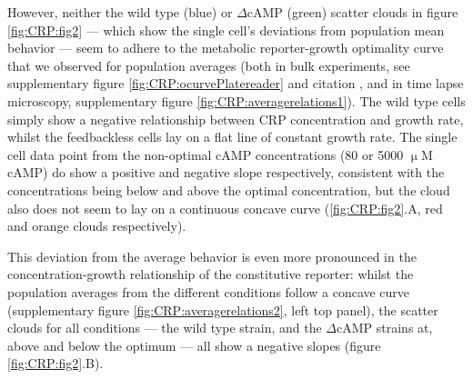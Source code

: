However, neither the wild type (blue) or $\Delta$cAMP (green) scatter clouds in figure \ref{fig:CRP:fig2}
--- which show the single cell's deviations from population mean behavior --- 
seem to adhere to the metabolic reporter-growth optimality curve that we observed for population averages 
(both in bulk experiments, see supplementary figure \ref{fig:CRP:ocurvePlatereader} and citation \cite{Towbin2017}, and in time lapse microscopy, supplementary figure \ref{fig:CRP:averagerelations1}).
%
The wild type cells simply show a negative relationship between CRP concentration and growth rate, whilst the feedbackless cells 
lay on a flat line of constant growth rate. 
%
The single cell data point from the non-optimal cAMP concentrations (80 or 5000 $\upmu$M cAMP) do show a positive and negative slope respectively, 
consistent with the concentrations being below and above the optimal concentration,
but the cloud also does not seem to lay on a continuous concave curve (\ref{fig:CRP:fig2}.A, red and orange clouds respectively).
%



This deviation from the average behavior is even more pronounced in the concentration-growth relationship of the constitutive reporter:
whilst the population averages from the different conditions follow a concave curve (supplementary figure \ref{fig:CRP:averagerelations2}, left top panel), 
%
the scatter clouds for all conditions --- the wild type strain, and the $\Delta$cAMP strains at, above and below the optimum --- all show a negative slopes (figure \ref{fig:CRP:fig2}.B).


%
%

